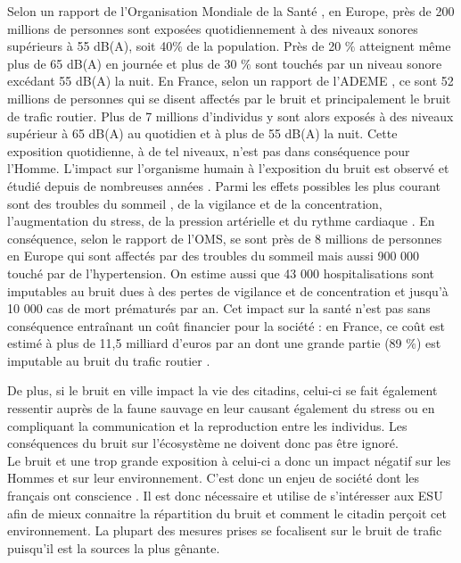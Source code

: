 Selon un rapport de l'Organisation Mondiale de la Santé \cite{who_burden_2017}, en Europe, près de 200 millions de personnes sont exposées quotidiennement à des niveaux sonores supérieurs à 55 dB(A), soit 40$\%$ de la population. Près de 20 $\%$ atteignent même plus de 65 dB(A) en journée et plus de 30 $\%$ sont touchés par un niveau sonore excédant 55 dB(A) la nuit. En France, selon un rapport de l'ADEME \cite{europeens2016analyse}, ce sont 52 millions de personnes qui se disent affectés par le bruit et principalement le bruit de trafic routier. Plus de 7 millions d'individus y sont alors exposés à des niveaux supérieur à 65 dB(A) au quotidien et à plus de 55 dB(A) la nuit.
Cette exposition quotidienne, à de tel niveaux, n'est pas dans conséquence pour l'Homme. L'impact sur l'organisme humain à l'exposition du bruit est observé et étudié depuis de nombreuses années \cite{ising1980health}. Parmi les effets possibles les plus courant sont des troubles du sommeil \cite{pirrera2010nocturnal}, de la vigilance et de la concentration, l'augmentation du stress, de la pression artérielle et du rythme cardiaque \cite{babisch2008road, babisch2005traffic}. En conséquence, selon le rapport de l'OMS, se sont près de 8 millions de personnes en Europe qui sont affectés par des troubles du sommeil mais aussi 900 000 touché par de l'hypertension. On estime aussi que 43 000 hospitalisations sont imputables au bruit dues à des pertes de vigilance et de concentration  et jusqu'à 10 000 cas de mort prématurés par an. Cet impact sur la santé n'est pas sans conséquence entraînant un coût financier pour la société : en France, ce coût est estimé à plus de 11,5 milliard d'euros par an dont une grande partie (89 $\%$) est imputable au bruit du trafic routier \cite{europeens2016analyse}. 

De plus, si le bruit en ville impact la vie des citadins, celui-ci se fait également ressentir auprès de la faune sauvage \cite{dutilleux_anthropogenic_2012, francis2009noise} en leur causant également du stress ou en compliquant la communication et la reproduction entre les individus. Les conséquences du bruit sur l'écosystème ne doivent donc pas être ignoré.\\

Le bruit et une trop grande exposition à celui-ci a donc un impact négatif sur les Hommes et sur leur environnement. C'est donc un enjeu de société dont les français ont conscience \cite{JNA2016etude}. 
Il est donc nécessaire et utilise de s'intéresser aux ESU afin de mieux connaitre la répartition du bruit et comment le citadin perçoit cet environnement.
La plupart des mesures prises se focalisent sur le bruit de trafic puisqu'il est la sources la plus gênante. 

